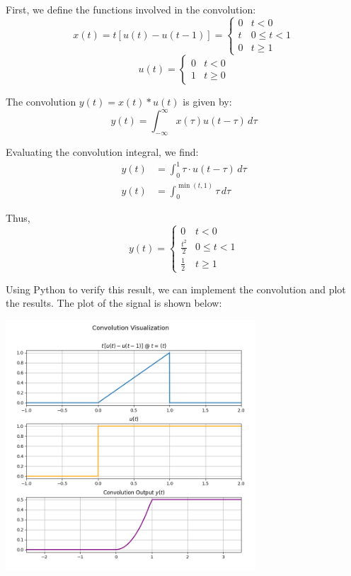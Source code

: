 \documentclass[a4paper, 10pt]{article}
\begin{document}
\begin{solution}
First, we define the functions involved in the convolution:
\[ x(t) = t[u(t) - u(t-1)] = \begin{cases} 0 & t < 0 \\ t & 0 \leq t < 1 \\ 0 & t \geq 1 \end{cases} \]
\[ u(t) = \begin{cases} 0 & t < 0 \\ 1 & t \geq 0 \end{cases} \]

The convolution \( y(t) = x(t) * u(t) \) is given by:
\[ y(t) = \int_{-\infty}^{\infty} x(\tau) u(t - \tau) \, d\tau \]

Evaluating the convolution integral, we find:
\begin{align*}
    y(t) &= \int_{0}^{1} \tau \cdot u(t - \tau) \, d\tau \\
    y(t) &= \int_{0}^{\min(t, 1)} \tau \, d\tau
\end{align*}

Thus,
\[ \boxed{
y(t) = \begin{cases} 
    0 & t < 0 \\
    \frac{t^2}{2} & 0 \leq t < 1 \\
    \frac{1}{2} & t \geq 1
\end{cases}
} \]

Using Python to verify this result, we can implement the convolution and plot the results.
The plot of the signal is shown below:
\begin{center}
    \includegraphics[width=0.7\textwidth]{images/problem_1_3_snapshot.png}
\end{center}
\end{solution}
\end{document}
